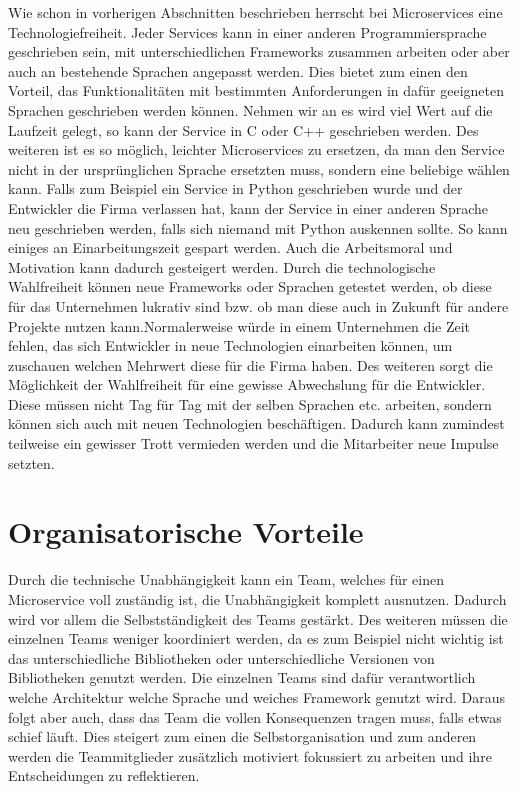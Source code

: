 Wie schon in vorherigen Abschnitten beschrieben herrscht bei Microservices eine Technologiefreiheit. Jeder Services kann in einer anderen Programmiersprache geschrieben sein, mit unterschiedlichen Frameworks zusammen arbeiten oder aber auch an bestehende Sprachen angepasst werden. Dies bietet zum einen den Vorteil, das Funktionalitäten mit bestimmten Anforderungen in dafür geeigneten Sprachen geschrieben werden können. Nehmen wir an es wird viel Wert auf die Laufzeit gelegt, so kann der Service in C oder C++ geschrieben werden. Des weiteren ist es so möglich, leichter Microservices zu ersetzen, da man den Service nicht in der ursprünglichen Sprache ersetzten muss, sondern eine beliebige wählen kann. Falls zum Beispiel ein Service in Python geschrieben wurde und der Entwickler die Firma verlassen hat, kann der Service in einer anderen Sprache neu geschrieben werden, falls sich niemand mit Python auskennen sollte. So kann einiges an Einarbeitungszeit gespart werden. Auch die Arbeitsmoral und Motivation kann dadurch gesteigert werden. Durch die technologische Wahlfreiheit können neue Frameworks oder Sprachen getestet werden, ob diese für das Unternehmen lukrativ sind bzw. ob man diese auch in Zukunft für andere Projekte nutzen kann.\newline Normalerweise würde in einem Unternehmen die Zeit fehlen, das sich Entwickler in neue Technologien einarbeiten können, um zuschauen welchen Mehrwert diese für die Firma haben. Des weiteren sorgt die Möglichkeit der Wahlfreiheit für eine gewisse Abwechslung für die Entwickler. Diese müssen nicht Tag für Tag mit der selben Sprachen etc. arbeiten, sondern können sich auch mit neuen Technologien beschäftigen. Dadurch kann zumindest teilweise ein gewisser Trott vermieden werden und die Mitarbeiter neue Impulse setzten.\cite{microsoft}


\section{Organisatorische Vorteile}

Durch die technische Unabhängigkeit kann ein Team, welches für einen Microservice voll zuständig ist, die Unabhängigkeit komplett ausnutzen. Dadurch wird vor allem die Selbstständigkeit des Teams gestärkt. Des weiteren müssen die einzelnen Teams weniger koordiniert werden, da es zum Beispiel nicht wichtig ist das unterschiedliche Bibliotheken oder unterschiedliche Versionen von Bibliotheken genutzt werden.
Die einzelnen Teams sind dafür verantwortlich welche Architektur welche Sprache und weiches Framework genutzt wird. Daraus folgt aber auch, dass das Team die vollen Konsequenzen tragen muss, falls etwas schief läuft. Dies steigert zum einen die Selbstorganisation und zum anderen werden die Teammitglieder zusätzlich motiviert fokussiert zu arbeiten und ihre Entscheidungen zu reflektieren.\cite{microservices}

